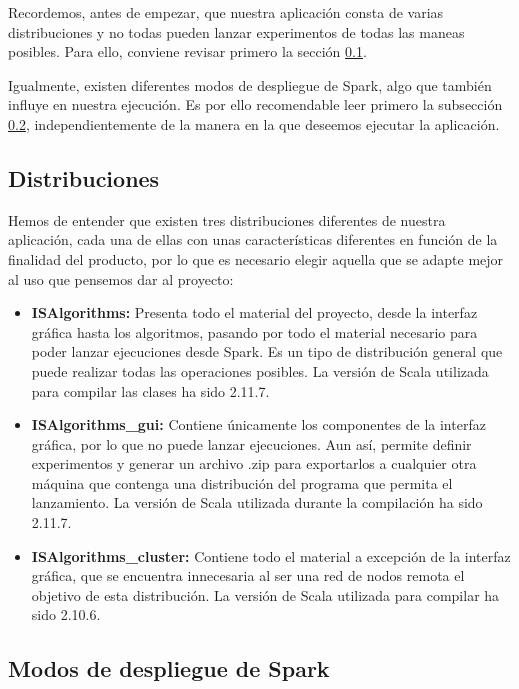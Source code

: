 Recordemos, antes de empezar, que nuestra aplicación consta de varias distribuciones y no todas pueden lanzar experimentos de todas las maneas posibles. Para ello, conviene revisar primero la sección \ref{subsec:distribuciones}.

Igualmente, existen diferentes modos de despliegue de Spark, algo que también influye en nuestra ejecución. Es por ello recomendable leer primero la subsección \ref{subsec:modosDespliegueSpark}, independientemente de la manera en la que deseemos ejecutar la aplicación.

\subsection{Distribuciones}\label{subsec:distribuciones}

Hemos de entender que existen tres distribuciones diferentes de nuestra aplicación, cada una de ellas con unas características diferentes en función de la finalidad del producto, por lo que es necesario elegir aquella que se adapte mejor al uso que pensemos dar al proyecto:

\begin{itemize}
	\item \textbf{ISAlgorithms:} Presenta todo el material del proyecto, desde la interfaz gráfica hasta los algoritmos, pasando por todo el material necesario para poder lanzar ejecuciones desde Spark. Es un tipo de distribución general que puede realizar todas las operaciones posibles. La versión de Scala utilizada para compilar las clases ha sido 2.11.7.
	\item \textbf{ISAlgorithms\_gui:} Contiene únicamente los componentes de la interfaz gráfica, por lo que no puede lanzar ejecuciones. Aun así, permite definir experimentos y generar un archivo .zip para exportarlos a cualquier otra máquina que contenga una distribución del programa que permita el lanzamiento. La versión de Scala utilizada durante la compilación ha sido 2.11.7.
	\item \textbf{ISAlgorithms\_cluster:} Contiene todo el material a excepción de la interfaz gráfica, que se encuentra innecesaria al ser una red de nodos remota el objetivo de esta distribución. La versión de Scala utilizada para compilar ha sido 2.10.6.
\end{itemize}

\subsection{Modos de despliegue de Spark}\label{subsec:modosDespliegueSpark}

